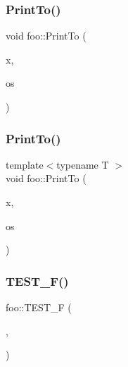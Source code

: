 \mbox{\label{namespacefoo_ac435de653934c97045bbdba8c8afbe3f}} 
\subsubsection{\texorpdfstring{PrintTo()}{PrintTo()}\hspace{0.1cm}{\footnotesize\ttfamily [1/2]}}
{\footnotesize\ttfamily void foo\+::\+Print\+To (\begin{DoxyParamCaption}\item[{const \mbox{\hyperlink{structfoo_1_1_printable_via_print_to}{Printable\+Via\+Print\+To}} \&}]{x,  }\item[{\+::std\+::ostream $\ast$}]{os }\end{DoxyParamCaption})}

\mbox{\label{namespacefoo_a7b78eba501ea7ff1226a8cb40b6e3d92}} 
\subsubsection{\texorpdfstring{PrintTo()}{PrintTo()}\hspace{0.1cm}{\footnotesize\ttfamily [2/2]}}
{\footnotesize\ttfamily template$<$typename T $>$ \\
void foo\+::\+Print\+To (\begin{DoxyParamCaption}\item[{const \mbox{\hyperlink{classfoo_1_1_printable_via_print_to_template}{Printable\+Via\+Print\+To\+Template}}$<$ T $>$ \&}]{x,  }\item[{\+::std\+::ostream $\ast$}]{os }\end{DoxyParamCaption})}

\mbox{\label{namespacefoo_a849b0cc834d25429f0391db7e0eb9dc1}} 
\subsubsection{\texorpdfstring{TEST\_F()}{TEST\_F()}\hspace{0.1cm}{\footnotesize\ttfamily [1/6]}}
{\footnotesize\ttfamily foo\+::\+T\+E\+S\+T\+\_\+F (\begin{DoxyParamCaption}\item[{\mbox{\hyperlink{classfoo_1_1_mixed_up_test_suite_test}{Mixed\+Up\+Test\+Suite\+Test}}}]{,  }\item[{First\+Test\+From\+Namespace\+Foo}]{ }\end{DoxyParamCaption})}

